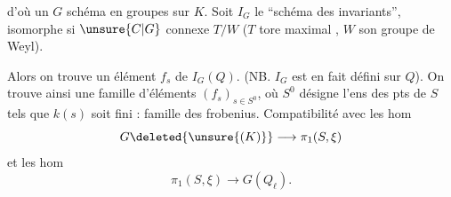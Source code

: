 d'où un $G$ schéma en groupes sur $K$. Soit $I_G$ le ``schéma des invariants'', isomorphe si $\unsure{C|G}$ connexe  $T/W$ ($T$ tore maximal , $W$ son groupe de Weyl).

Alors on trouve un élément $f_s$ de $I_G(Q)$. (NB. $I_G$ est en fait défini sur $Q$). On trouve ainsi une famille d'éléments $(f_s)_{s\in S^0}$, où $S^0$ désigne l'ens des pts de $S$ tels que $k(s)$ soit fini : famille des frobenius. Compatibilité avec les hom
\[
G\deleted{\unsure{(K)}}\longrightarrow\pi_1(S,\xi)
\]
et les hom
\[
\pi_1(S,\xi)\longrightarrow G(Q_\ell).
\]

